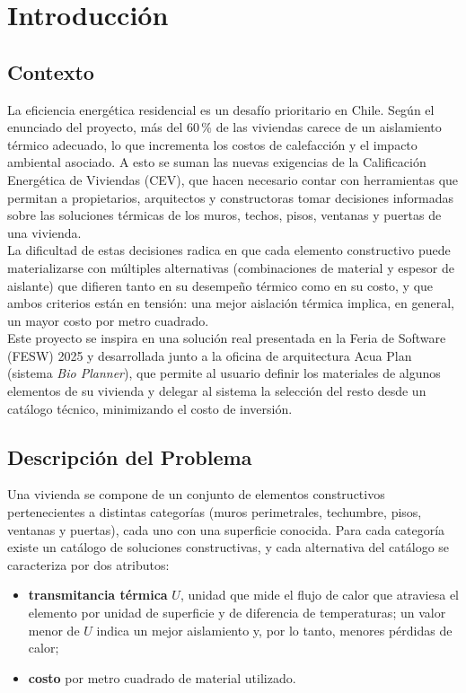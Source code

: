 \section{Introducción}

\subsection{Contexto}
La eficiencia energética residencial es un desafío prioritario en Chile. Según el enunciado del proyecto, m\'as del 60\,\% de las viviendas carece de un aislamiento térmico adecuado, lo que incrementa los costos de calefacción y el impacto ambiental asociado. A esto se suman las nuevas exigencias de la Calificación Energética de Viviendas (CEV), que hacen necesario contar con herramientas que permitan a propietarios, arquitectos y constructoras tomar decisiones informadas sobre las soluciones térmicas de los muros, techos, pisos, ventanas y puertas de una vivienda.\\

La dificultad de estas decisiones radica en que cada elemento constructivo puede
materializarse con múltiples alternativas (combinaciones de material y espesor de aislante) que difieren tanto en su desempeño térmico como en su costo, y que ambos criterios están en tensión: una mejor aislación térmica implica, en general, un mayor costo por metro cuadrado.\\

Este proyecto se inspira en una solución real presentada en la Feria de Software
(FESW) 2025 y desarrollada junto a la oficina de arquitectura Acua Plan (sistema
\textit{Bio Planner}), que permite al usuario definir los materiales de algunos
elementos de su vivienda y delegar al sistema la selección del resto desde un
catálogo técnico, minimizando el costo de inversión.

\subsection{Descripción del Problema}
Una vivienda se compone de un conjunto de elementos constructivos pertenecientes a distintas categorías (muros perimetrales, techumbre, pisos, ventanas y puertas), cada uno con una superficie conocida. Para cada categoría existe un catálogo de soluciones constructivas, y cada alternativa del catálogo se caracteriza por dos atributos:\\
\begin{itemize}
	\item \textbf{transmitancia térmica} $U$, unidad que mide el flujo de calor que atraviesa el elemento por unidad de superficie y de diferencia de temperaturas; un valor menor de $U$ indica un mejor aislamiento y, por lo tanto, menores pérdidas de calor;
	\item \textbf{costo} por metro cuadrado de material utilizado.\\
\end{itemize}

